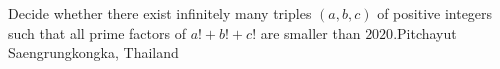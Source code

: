 Decide whether there exist infinitely many triples $(a,b,c)$ of positive integers such that all prime factors of $a!+b!+c!$ are smaller than $2020$.Pitchayut Saengrungkongka, Thailand
